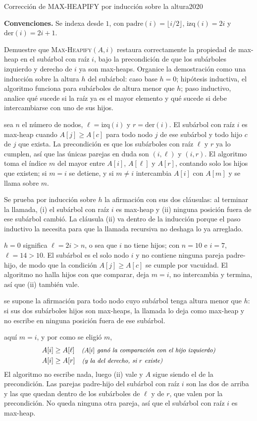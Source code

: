 \documentclass[11pt,letterpaper]{article}
\begin{document}
\encabezadoEjercicio
  {Corrección de MAX-HEAPIFY por inducción sobre la altura}{20}{20}

\noindent\textbf{Convenciones.}
Se indexa desde $1$, con $\mathrm{padre}(i) = \lfloor i/2
\rfloor$, $\mathrm{izq}(i) = 2i$ y $\mathrm{der}(i) = 2i + 1$.

\noindent Demuestre que \textsc{Max-Heapify}$(A, i)$ restaura
correctamente la propiedad de max-heap en el subárbol con raíz $i$,
bajo la precondición de que los subárboles izquierdo y derecho de $i$
ya son max-heaps. Organice la demostración como una inducción sobre la
altura $h$ del subárbol: caso base $h = 0$; hipótesis inductiva, el
algoritmo funciona para subárboles de altura menor que $h$; paso
inductivo, analice qué sucede si la raíz ya es el mayor elemento y qué
sucede si debe intercambiarse con uno de sus hijos.

 sea $n$ el número de nodos,
$\ell = \mathrm{izq}(i)$ y $r = \mathrm{der}(i)$. El subárbol con raíz
$i$ es max-heap cuando $A[j] \ge A[c]$ para todo nodo $j$ de ese
subárbol y todo hijo $c$ de $j$ que exista. La precondición es que los
subárboles con raíz $\ell$ y $r$ ya lo cumplen, así que las únicas
parejas en duda son $(i, \ell)$ y $(i, r)$. El algoritmo toma el
índice $m$ del mayor entre $A[i]$, $A[\ell]$ y $A[r]$, contando solo
los hijos que existen; si $m = i$ se detiene, y si $m \ne i$
intercambia $A[i]$ con $A[m]$ y se llama sobre $m$.

Se prueba por inducción sobre $h$ la afirmación con sus dos cláusulas:
al terminar la llamada, (i) el subárbol con raíz $i$ es max-heap y
(ii) ninguna posición fuera de ese subárbol cambió. La cláusula (ii)
va dentro de la inducción porque el paso inductivo la necesita para
que la llamada recursiva no deshaga lo ya arreglado.

 $h = 0$ significa $\ell = 2i > n$, o sea que $i$ no
tiene hijos; con $n = 10$ e $i = 7$, $\ell = 14 > 10$. El subárbol es
el solo nodo $i$ y no contiene ninguna pareja padre-hijo, de modo que
la condición $A[j] \ge A[c]$ se cumple por vacuidad. El algoritmo no
halla hijos con que comparar, deja $m = i$, no intercambia y termina,
así que (ii) también vale.

 se supone la afirmación para todo nodo
cuyo subárbol tenga altura menor que $h$: si sus dos subárboles hijos
son max-heaps, la llamada lo deja como max-heap y no escribe en
ninguna posición fuera de ese subárbol.

 aquí $m = i$, y
por como se eligió $m$,
\begin{align*}
  A[i] &\ge A[\ell]
         \quad\text{\small\itshape ($A[i]$ ganó la comparación con el hijo izquierdo)} \\
  A[i] &\ge A[r]
         \quad\text{\small\itshape (y la del derecho, si $r$ existe)}
\end{align*}
El algoritmo no escribe nada, luego (ii) vale y $A$ sigue siendo el de
la precondición. Las parejas padre-hijo del subárbol con raíz $i$ son
las dos de arriba y las que quedan dentro de los subárboles de $\ell$
y de $r$, que valen por la precondición. No queda ninguna otra pareja,
así que el subárbol con raíz $i$ es max-heap.
\end{document}
